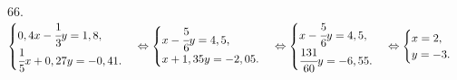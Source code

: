 66. $\begin{cases}
0,4x-\cfrac{1}{3}y=1,8,\\
\cfrac{1}{5}x+0,27y=-0,41.
\end{cases}\Leftrightarrow\begin{cases}
x-\cfrac{5}{6}y=4,5,\\
x+1,35y=-2,05.
\end{cases}\Leftrightarrow\begin{cases}
x-\cfrac{5}{6}y=4,5,\\
\cfrac{131}{60}y=-6,55.
\end{cases}\Leftrightarrow\begin{cases}
x=2,\\
y=-3.
\end{cases}$\\
